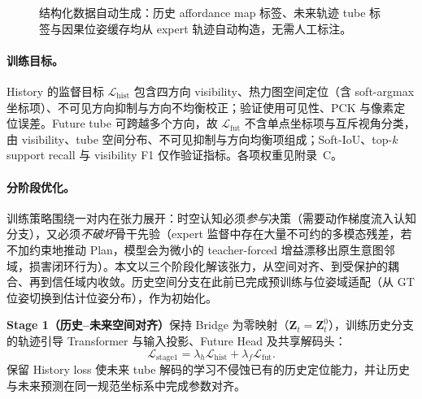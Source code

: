 \documentclass[10pt]{ctexart}
\begin{document}
\begin{figure}[h]
    \centering
    \caption{结构化数据自动生成：历史 affordance map 标签、未来轨迹 tube 标签与因果位姿缓存均从 expert 轨迹自动构造，无需人工标注。}
    \label{fig:labels}
\end{figure}

\paragraph{训练目标。}
History 的监督目标 $\mathcal{L}_{\mathrm{hist}}$ 包含四方向 visibility、热力图空间定位（含 soft-argmax 坐标项）、不可见方向抑制与方向不均衡校正；验证使用可见性、PCK 与像素定位误差。Future tube 可跨越多个方向，故 $\mathcal{L}_{\mathrm{fut}}$ 不含单点坐标项与互斥视角分类，由 visibility、tube 空间分布、不可见抑制与方向均衡项组成；Soft-IoU、top-$k$ support recall 与 visibility F1 仅作验证指标。各项权重见附录~C。

\paragraph{分阶段优化。}
训练策略围绕一对内在张力展开：时空认知必须\emph{参与}决策（需要动作梯度流入认知分支），又必须\emph{不破坏}骨干先验（expert 监督中存在大量不可约的多模态残差，若不加约束地推动 Plan，模型会为微小的 teacher-forced 增益漂移出原生意图邻域，损害闭环行为）。本文以三个阶段化解该张力，从空间对齐、到受保护的耦合、再到信任域内收敛。历史空间分支在此前已完成预训练与位姿域适配（从 GT 位姿切换到估计位姿分布），作为初始化。

\textbf{Stage 1（历史--未来空间对齐）}保持 Bridge 为零映射（$\mathbf{Z}_t=\mathbf{Z}^{0}_t$），训练历史分支的轨迹引导 Transformer 与输入投影、Future Head 及共享解码头：
\begin{equation}
\mathcal{L}_{\mathrm{stage1}}
=
\lambda_h\mathcal{L}_{\mathrm{hist}}
+
\lambda_f\mathcal{L}_{\mathrm{fut}}.
\label{eq:stage1}
\end{equation}
保留 History loss 使未来 tube 解码的学习不侵蚀已有的历史定位能力，并让历史与未来预测在同一规范坐标系中完成参数对齐。
\end{document}
